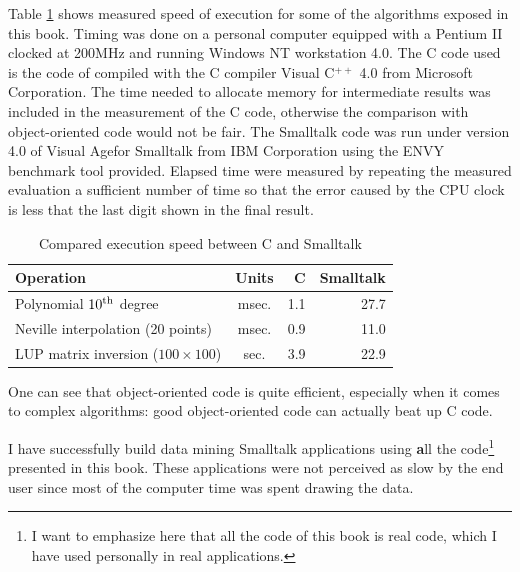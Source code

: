 Table \ref{tb:speed} shows measured speed of execution for some of
the algorithms exposed in this book. Timing was done on a personal
computer equipped with a Pentium II clocked at 200MHz and running
Windows NT workstation 4.0. The C code used is the code of
\cite{Press} compiled with the C compiler Visual C$^{++}$ 4.0 from
Microsoft Corporation. The time needed to allocate memory for
intermediate results was included in the measurement of the C
code, otherwise the comparison with object-oriented code would not
be fair. The Smalltalk code was run under version 4.0 of Visual
Age\tm for Smalltalk from IBM Corporation using the ENVY benchmark
tool provided.
Elapsed time were measured
by repeating the measured evaluation a sufficient number of time
so that the error caused by the CPU clock is less that the last
digit shown in the final result.
\begin{table}[h]
\caption{Compared execution speed between C and Smalltalk}
\label{tb:speed} \vspace{1 ex}
\begin{tabular}{|l | c r r |} \hline
  \hfil \textbf{Operation} & \textbf{Units} & \textbf{C}\hfil & \textbf{Smalltalk}\hfil \\ \hline
  Polynomial $10^{\mathop{\textrm{th}}}$ degree & msec. & 1.1 & 27.7 \\
  Neville interpolation (20 points) & msec. & 0.9 & 11.0 \\
  LUP matrix inversion ($100\times 100$)& sec. & 3.9 & 22.9 \\ \hline
\end{tabular}
\end{table}

One can see that object-oriented code is quite efficient,
especially when it comes to complex algorithms: good
object-oriented code can actually beat up C code.


I have successfully build data mining Smalltalk
applications using {\textbf all the code}\footnote{I want to emphasize
here that all the code of this book is real code, which I have
used personally in real applications.} presented in this book.
These applications were not perceived as slow by the end user
since most of the computer time was spent drawing the data.

